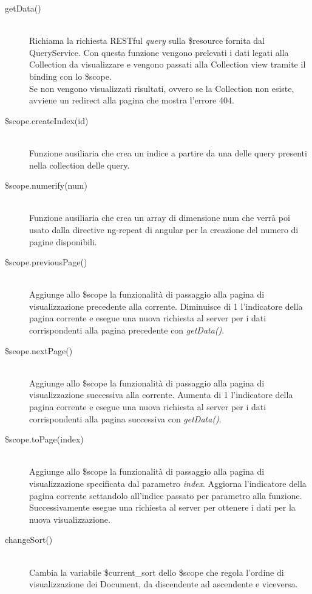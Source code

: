 \begin{description}
\begin{description}
  \item[getData()] \hfill \\
  Richiama la richiesta RESTful \textit{query} sulla \$resource fornita dal QueryService.
  Con questa funzione vengono prelevati i dati legati alla Collection da visualizzare e vengono
  passati alla Collection view tramite il binding con lo \$scope. \\
  Se non vengono visualizzati risultati, ovvero se la Collection non esiste, avviene un redirect alla pagina
  che mostra l'errore 404.
  
    \item[\$scope.createIndex(id)] \hfill \\
  Funzione ausiliaria che crea un indice a partire da una delle query presenti nella collection delle query.
  
  \item[\$scope.numerify(num)] \hfill \\
  Funzione ausiliaria che crea un array di dimensione num che verrà poi usato dalla directive   ng-repeat di angular per la creazione del 
  numero di pagine  disponibili.
  
  \item[\$scope.previousPage()] \hfill \\
  Aggiunge allo \$scope la funzionalità di passaggio alla pagina di visualizzazione precedente alla corrente.
  Diminuisce di 1 l'indicatore della pagina corrente e esegue una nuova richiesta al server per i dati corrispondenti
  alla pagina precedente con \emph{getData()}.
  
  \item[\$scope.nextPage()] \hfill \\
  Aggiunge allo \$scope la funzionalità di passaggio alla pagina di visualizzazione successiva alla corrente.
  Aumenta di 1 l'indicatore della pagina corrente e esegue una nuova richiesta al server per i dati corrispondenti
  alla pagina successiva con \emph{getData()}.
  
  \item[\$scope.toPage(index)] \hfill \\
  Aggiunge allo \$scope la funzionalità di passaggio alla pagina di visualizzazione specificata dal parametro \emph{index}.
  Aggiorna l'indicatore della pagina corrente settandolo all'indice passato per parametro alla funzione.
  Successivamente esegue una richiesta al server per ottenere i dati per la nuova visualizzazione.
  
  \item[changeSort()] \hfill \\
  Cambia la variabile \$current\_sort dello \$scope che regola l'ordine di visualizzazione dei Document, da discendente ad
  ascendente e viceversa.
  

\end{description}
\end{description}

